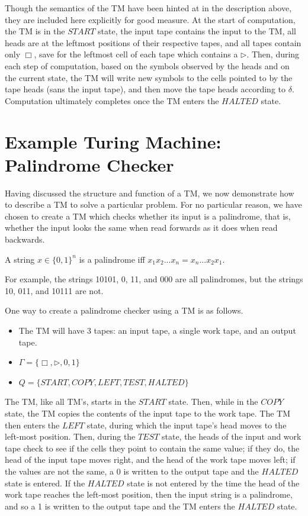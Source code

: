 \documentclass[usletter]{article}
\begin{document}
Though the semantics of the TM have been hinted at in the description above, they are included here explicitly for good measure. At the start of computation, the TM is in the $START$ state, the input tape contains the input to the TM, all heads are at the leftmost positions of their respective tapes, and all tapes contain only $\Box$, save for the leftmost cell of each tape which contains a $\rhd$. Then, during each step of computation, based on the symbols observed by the heads and on the current state, the TM will write new symbols to the cells pointed to by the tape heads (sans the input tape), and then move the tape heads according to $\delta$. Computation ultimately completes once the TM enters the $HALTED$ state.

\section{Example Turing Machine: Palindrome Checker}

Having discussed the structure and function of a TM, we now demonstrate how to describe a TM to solve a particular problem. For no particular reason, we have chosen to create a TM which checks whether its input is a palindrome, that is, whether the input looks the same when read forwards as it does when read backwards.

\begin{definition}
A string $x \in \{0,1\}^n$ is a palindrome iff $x_1x_2...x_n = x_n...x_2x_1$.
\end{definition}
\noindent
For example, the strings 10101, 0, 11, and 000 are all palindromes, but the strings 10,  011, and 10111 are not.

One way to create a palindrome checker using a TM is as follows.
\begin{itemize}
\item The TM will have 3 tapes: an input tape, a single work tape, and an output tape.
\item $\Gamma = \{\Box, \rhd, 0, 1\}$
\item $Q = \{START, COPY, LEFT, TEST, HALTED\}$
\end{itemize}

The TM, like all TM's, starts in the $START$ state. Then, while in the $COPY$ state, the TM copies the contents of the input tape to the work tape. The TM then enters the $LEFT$ state, during which the input tape's head moves to the left-most position. Then, during the $TEST$ state, the heads of the input and work tape check to see if the cells they point to contain the same value; if they do, the head of the input tape moves right, and the head of the work tape moves left; if the values are not the same, a 0 is written to the output tape and the $HALTED$ state is entered. If the $HALTED$ state is not entered by the time the head of the work tape reaches the left-most position, then the input string is a palindrome, and so a 1 is written to the output tape and the TM enters the $HALTED$ state.
\end{document}
